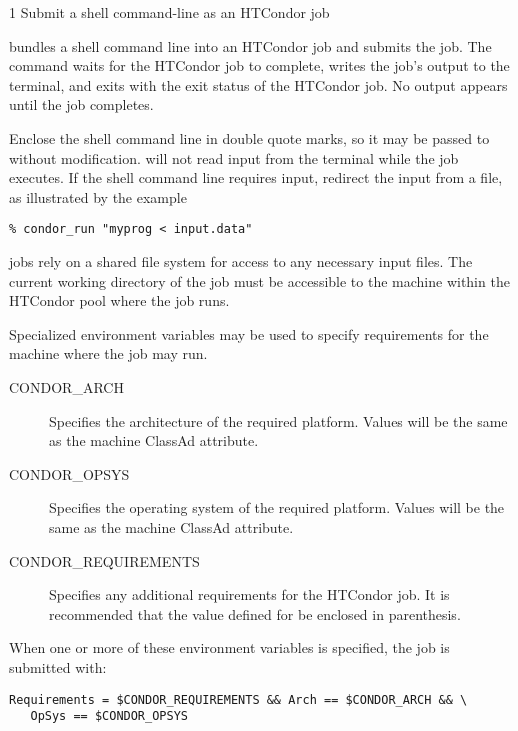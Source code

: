 \begin{ManPage}{\label{man-condor-run}}{1}
{Submit a shell command-line as an HTCondor job}
\Synopsis {}


\Description
{} bundles a shell command line into an HTCondor
job and submits the job.
The  command waits for the HTCondor job to complete,
writes the job's output to the terminal,
and exits with the exit status of the HTCondor job.
No output appears until the job completes.

Enclose the shell command line in double quote marks,
so it may be passed to
 without modification.
 will not read input from the terminal while the job
executes.  If the shell command line requires input,
redirect the input from a file, as illustrated by the example
\begin{verbatim}
% condor_run "myprog < input.data"
\end{verbatim}

 jobs rely on a shared file system for
access to any necessary input files.
The current working directory of the job must be
accessible to the machine within the HTCondor pool where the job runs.

Specialized environment variables may be used to specify
requirements for the machine where the job may run.

\begin{description}
\item[CONDOR\_ARCH] Specifies the architecture of the required
  platform. Values will be the same as the 
  machine ClassAd attribute.
\item[CONDOR\_OPSYS] Specifies the operating system of the required
  platform. Values will be the same as the 
  machine ClassAd attribute.
\item[CONDOR\_REQUIREMENTS] Specifies any additional requirements for
  the HTCondor job.  It is recommended that the value defined for
   be enclosed in parenthesis.
\end{description}

When one or more of these environment variables is specified, the job is
submitted with:

\begin{verbatim}
Requirements = $CONDOR_REQUIREMENTS && Arch == $CONDOR_ARCH && \
   OpSys == $CONDOR_OPSYS
\end{verbatim}


\end{ManPage}

